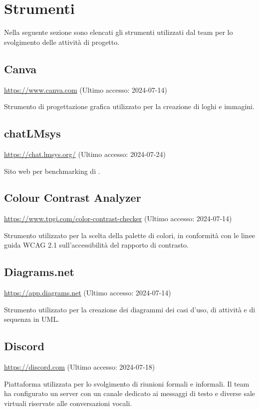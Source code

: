 \section{Strumenti}\label{strumenti}
\par Nella seguente sezione sono elencati gli strumenti utilizzati dal team per lo svolgimento delle attività di progetto.

\subsection{Canva}
\par \href{https://www.canva.com}{https://www.canva.com} (Ultimo accesso: 2024-07-14)
\par Strumento di progettazione grafica utilizzato per la creazione di loghi e immagini.

\subsection{chatLMsys}
\par \href{https://chat.lmsys.org/}{https://chat.lmsys.org/} (Ultimo accesso: 2024-07-24)
\par Sito web per benchmarking di .

\subsection{Colour Contrast Analyzer}
\par \href{https://www.tpgi.com/color-contrast-checker}{https://www.tpgi.com/color-contrast-checker} (Ultimo accesso: 2024-07-14)
\par Strumento utilizzato per la scelta della palette di colori, in conformità con le linee guida WCAG 2.1 sull'accessibilità del rapporto di contrasto.

\subsection{Diagrams.net}
\par \href{https://app.diagrams.net}{https://app.diagrams.net} (Ultimo accesso: 2024-07-14)
\par Strumento utilizzato per la creazione dei diagrammi dei casi d'uso, di attività e di sequenza in UML.

\subsection{Discord}
\par \href{https://discord.com}{https://discord.com} (Ultimo accesso: 2024-07-18)
\par Piattaforma utilizzata per lo svolgimento di riunioni formali e informali. Il team ha configurato un server con un canale dedicato ai messaggi di testo e diverse sale virtuali riservate alle conversazioni vocali.
    
